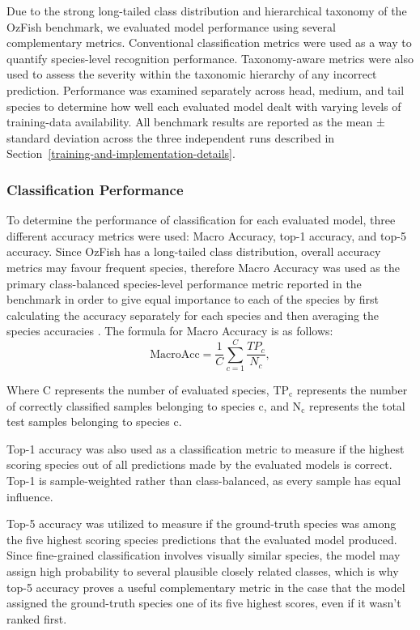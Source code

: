 \documentclass[preprint,12pt]{elsarticle}
\providecommand{\textsubscript}[1]{\ensuremath{_{\text{#1}}}}
\begin{document}
Due to the strong long-tailed class distribution
\citep{ref15,ref16} and hierarchical taxonomy
\citep{ref23,ref24} of the OzFish benchmark, we
evaluated model performance using several complementary metrics.
Conventional classification metrics were used as a way to quantify
species-level recognition performance. Taxonomy-aware metrics were also
used to assess the severity within the taxonomic hierarchy of any
incorrect prediction. Performance was examined separately across head,
medium, and tail species to determine how well each evaluated model
dealt with varying levels of training-data availability. All benchmark
results are reported as the mean ± standard deviation across the three
independent runs described in Section~\ref{training-and-implementation-details}.

\subsubsection{Classification
Performance}\label{classification-performance}

To determine the performance of classification for each evaluated model,
three different accuracy metrics were used: Macro Accuracy, top-1
accuracy, and top-5 accuracy. Since OzFish has a long-tailed class
distribution, overall accuracy metrics may favour frequent species,
therefore Macro Accuracy was used as the primary class-balanced
species-level performance metric reported in the benchmark in order to
give equal importance to each of the species by first calculating the
accuracy separately for each species and then averaging the species
accuracies \citep{ref16,ref65}. The formula for Macro Accuracy is
as follows:
\begin{equation}
\mathrm{MacroAcc} = \frac{1}{C}\sum_{c=1}^{C}\frac{TP_c}{N_c},
\label{eq:macro-accuracy}
\end{equation}

Where C represents the number of evaluated species, TP\textsubscript{c}
represents the number of correctly classified samples belonging to
species c, and N\textsubscript{c} represents the total test samples
belonging to species c.

Top-1 accuracy was also used as a classification metric to measure if
the highest scoring species out of all predictions made by the evaluated
models is correct. Top-1 is sample-weighted rather than class-balanced,
as every sample has equal influence.

Top-5 accuracy was utilized to measure if the ground-truth species was
among the five highest scoring species predictions that the evaluated
model produced. Since fine-grained classification involves visually
similar species, the model may assign high probability to several
plausible closely related classes, which is why top-5 accuracy proves a
useful complementary metric in the case that the model assigned the
ground-truth species one of its five highest scores, even if it wasn't
ranked first.
\end{document}

